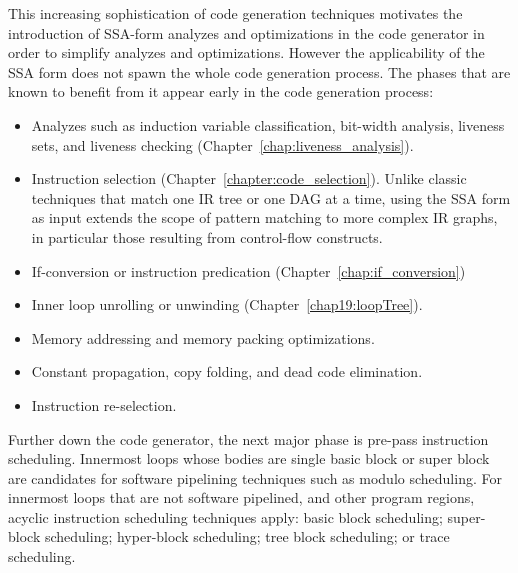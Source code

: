 This increasing sophistication of code generation techniques motivates the
introduction of SSA-form analyzes and optimizations in the code generator in
order to simplify analyzes and optimizations. However the applicability of the SSA
form does not spawn the whole code generation process. The phases that are known
to benefit from it appear early in the code generation process:
\begin{itemize}

\item Analyzes such as induction variable classification, bit-width analysis,
liveness sets, and liveness checking (Chapter~\ref{chap:liveness_analysis}).

\item Instruction selection (Chapter~\ref{chapter:code_selection}). Unlike
classic techniques that match one IR tree or one DAG at a time, using the SSA
form as input extends the scope of pattern matching to more complex IR graphs,
in particular those resulting from control-flow constructs.

\item If-conversion or instruction predication (Chapter~\ref{chap:if_conversion})

\item Inner loop unrolling or unwinding (Chapter~\ref{chap19:loopTree}).

\item Memory addressing and memory packing optimizations.

\item Constant propagation, copy folding, and dead code elimination.

\item Instruction re-selection.

\end{itemize}

Further down the code generator, the next major phase is pre-pass instruction
scheduling. Innermost loops whose bodies are single basic block or super
block are candidates for software pipelining techniques such as modulo
scheduling. For innermost loops that are not software pipelined, and other
program regions, acyclic instruction scheduling techniques apply: basic block
scheduling; super-block scheduling; hyper-block scheduling; tree block
scheduling; or trace scheduling.

